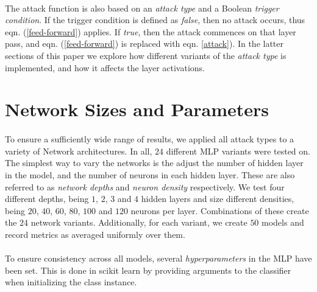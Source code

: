 \documentclass[12pt,letterpaper]{article}
\begin{document}
\paragraph*{}The attack function is also based on an \textit{attack type} and a Boolean \textit{trigger condition}. If the trigger condition is defined as \textit{false}, then no attack occurs, thus eqn. (\ref{feed-forward}) applies. If \textit{true}, then the attack commences on that layer pass, and eqn. (\ref{feed-forward}) is replaced with eqn. \ref{attack}). In the latter sections of this paper we explore how different variants of the \textit{attack type} is implemented, and how it affects the layer activations.


\section*{Network Sizes and Parameters}

\paragraph*{}To ensure a sufficiently wide range of results, we applied all attack types to a variety of Network architectures. In all, $24$ different MLP variants were tested on. The simplest way to vary the networks is the adjust the number of hidden layer in the model, and the number of neurons in each hidden layer. These are also referred to as \textit{network depths} and \textit{neuron density} respectively. We test four different depths, being $1$, $2$, $3$ and $4$ hidden layers and size different densities, being $20$, $40$, $60$, $80$, $100$ and $120$ neurons per layer. Combinations of these create the $24$ network variants. Additionally, for each variant, we create $50$ models and record metrics as averaged uniformly over them.

\paragraph*{}To ensure consistency across all models, several \textit{hyperparameters} in the MLP have been set. This is done in scikit learn by providing arguments to the classifier when initializing the class instance.
\end{document}
